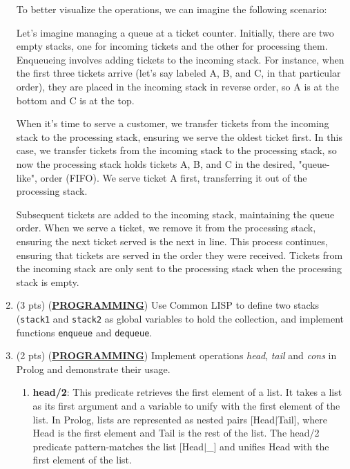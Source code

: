 \documentclass[12pt]{article}
\begin{document}
\begin{spacing}{1.5}
\begin{enumerate}
		      To better visualize the operations, we can imagine the following scenario:
		      		      		      		      
		      Let's imagine managing a queue at a ticket counter. Initially, there are two empty stacks, one for incoming tickets and the other for processing them. Enqueueing involves adding tickets to the incoming stack. For instance, when the first three tickets arrive (let's say labeled A, B, and C, in that particular order), they are placed in the incoming stack in reverse order, so A is at the bottom and C is at the top.
		      		      		      		              
		      When it's time to serve a customer, we transfer tickets from the incoming stack to the processing stack, ensuring we serve the oldest ticket first. In this case, we transfer tickets from the incoming stack to the processing stack, so now the processing stack holds tickets A, B, and C in the desired, "queue-like", order (FIFO). We serve ticket A first, transferring it out of the processing stack.
		      		      		      		              
		      Subsequent tickets are added to the incoming stack, maintaining the queue order. When we serve a ticket, we remove it from the processing stack, ensuring the next ticket served is the next in line. This process continues, ensuring that tickets are served in the order they were received. Tickets from the incoming stack are only sent to the processing stack when the processing stack is empty.
		      		      		      		      
		\item (3 pts) (\textbf{\uline{PROGRAMMING}}) Use Common LISP to define two stacks (\texttt{stack1} and \texttt{stack2} as global variables to hold the collection, and implement functions \texttt{enqueue} and \texttt{dequeue}.

            
		      		      		      		              
		\item (2 pts) (\textbf{\uline{PROGRAMMING}}) Implement operations \textit{head}, \textit{tail} and \textit{cons} in Prolog and demonstrate their usage.

            
		      		      		      
		      \begin{enumerate}
		      	\item \textbf{head/2}: This predicate retrieves the first element of a list. It takes a list as its first argument and a variable to unify with the first element of the list. In Prolog, lists are represented as nested pairs [Head$|$Tail], where Head is the first element and Tail is the rest of the list. The head/2 predicate pattern-matches the list [Head$|$\_] and unifies Head with the first element of the list.
		      	      		      	      		      	      

\end{enumerate}
\end{enumerate}
\end{spacing}
\end{document}
